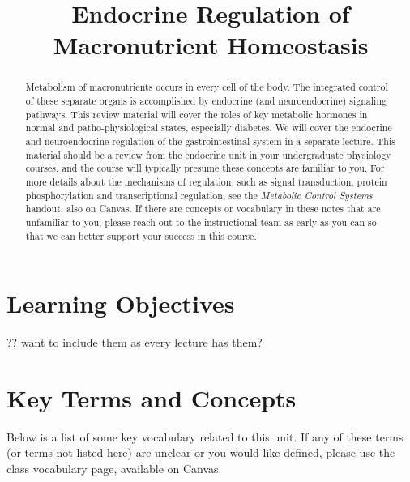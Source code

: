 \documentclass{tufte-handout}
\title{Endocrine Regulation of Macronutrient Homeostasis}
\author{}
\date{}  %
\begin{document}
\maketitle%

\begin{abstract}
\noindent Metabolism of macronutrients occurs in every cell of the body.  The integrated control of these separate organs is accomplished by endocrine (and neuroendocrine) signaling pathways.  This review material will cover the roles of  key metabolic hormones in normal and patho-physiological states, especially diabetes.  We will cover the endocrine and neuroendocrine regulation of the gastrointestinal system in a separate lecture.  This material should be a review from the endocrine unit in your undergraduate physiology courses, and the course will typically presume these concepts are familiar to you.  For more details about the mechanisms of regulation, such as signal transduction, protein phosphorylation and transcriptional regulation, see the \emph{Metabolic Control Systems} handout, also on Canvas.  If there are concepts or vocabulary in these notes that are unfamiliar to you, please reach out to the instructional team as early as you can so that we can better support your success in this course.
\end{abstract}

\tableofcontents


\pagebreak

\section{Learning Objectives}?? want to include them as every lecture has them? 

\section{Key Terms and Concepts}

Below is a list of some key vocabulary related to this unit.  If any of these terms (or terms not listed here) are unclear or you would like defined, please use the class vocabulary page, available on Canvas.
\end{document}
